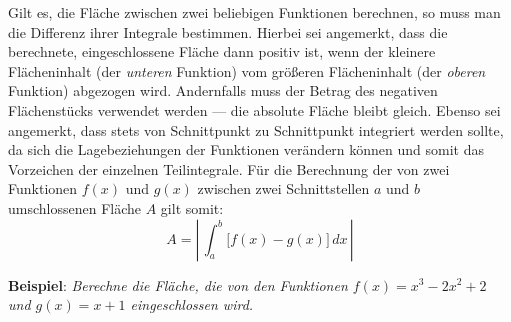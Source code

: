 \pagebreak


Gilt es, die Fl\"{a}che zwischen zwei beliebigen Funktionen berechnen, so muss man die Differenz ihrer Integrale bestimmen. Hierbei sei angemerkt, dass die berechnete, eingeschlossene Fl\"{a}che dann positiv ist, wenn der kleinere Fl\"{a}cheninhalt (der \emph{unteren} Funktion) vom gr\"{o}\ss{}eren Fl\"{a}cheninhalt (der \emph{oberen} Funktion) abgezogen wird. Andernfalls muss der Betrag des negativen Fl\"{a}chenst\"{u}cks verwendet werden --- die absolute Fl\"{a}che bleibt gleich. Ebenso sei angemerkt, dass stets von Schnittpunkt zu Schnittpunkt integriert werden sollte, da sich die Lagebeziehungen der Funktionen ver\"{a}ndern k\"{o}nnen und somit das Vorzeichen der einzelnen Teilintegrale. F\"{u}r die Berechnung der von zwei Funktionen $f(x)$ und $g(x)$ zwischen zwei Schnittstellen $a$ und $b$ umschlossenen Fl\"{a}che $A$ gilt somit: $$A = \left| \, \int_a^b \big[f(x) - g(x)\big] \, dx \, \right|$$

\textbf{Beispiel}: \emph{Berechne die Fl\"{a}che, die von den Funktionen $f(x) = x^3 - 2x^2 + 2$ und $g(x) = x + 1$ eingeschlossen wird.}

\extrapar

\begin{figure}[h!]
	\centering
\end{figure}

